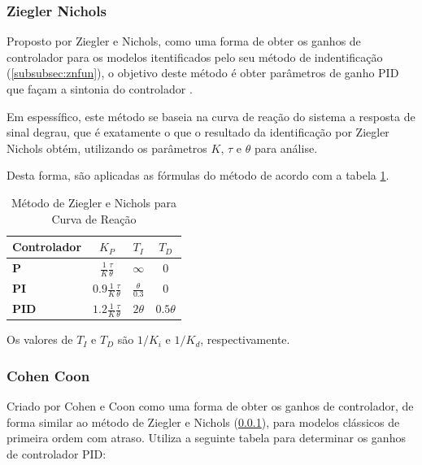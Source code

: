 \subsubsection{Ziegler Nichols}\label{subsubsec:znctr}

Proposto por Ziegler e Nichols, como uma forma de obter os ganhos de controlador para os modelos itentificados
pelo seu método de indentificação (\ref{subsubsec:znfun}), o objetivo deste método é obter parâmetros de ganho PID que
façam a sintonia do controlador \cite{apostpidsint}.

Em espessífico, este método se baseia na curva de reação do sistema a resposta de sinal degrau, que é
exatamente o que o resultado da identificação por Ziegler Nichols obtém, utilizando os parâmetros $K$, $\tau$ e $\theta$
para análise.

Desta forma, são aplicadas as fórmulas do método de acordo com a tabela \ref{tab:zncntb}.

\begin{table}[h]
    \begin{center}
        \begin{tabular}{ | l | c | c | c | }
            \hline
            {\textbf{Controlador}} & {$K_P$}                               & {$T_I$}                & {$T_D$}       \\
            \hline
            {\textbf{P}}           & {$\frac{1}{K}\frac{\tau}{\theta}$}    & {$\infty$}             & {$0$}         \\
            \hline
            {\textbf{PI}}          & {$0.9\frac{1}{K}\frac{\tau}{\theta}$} & {$\frac{\theta}{0.3}$} & {$0$}         \\
            \hline
            {\textbf{PID}}         & {$1.2\frac{1}{K}\frac{\tau}{\theta}$} & {$2\theta$}            & {$0.5\theta$} \\
            \hline
        \end{tabular}
        \caption{Método de Ziegler e Nichols para Curva de Reação}
        \label{tab:zncntb}
    \end{center}
\end{table}

Os valores de $T_I$ e $T_D$ são $1/K_i$ e $1/K_d$, respectivamente.

\subsubsection{Cohen Coon}

Criado por Cohen e Coon como uma forma de obter os ganhos de controlador, de forma similar ao método de Ziegler e Nichols
(\ref{subsubsec:znctr}), para modelos clássicos de primeira ordem com atraso.
Utiliza a seguinte tabela para determinar os ganhos de controlador PID:

